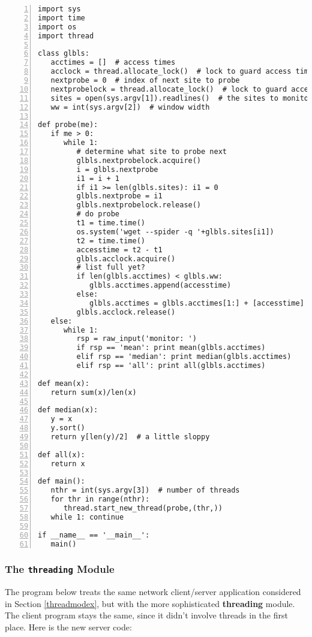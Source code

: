 \begin{Verbatim}[fontsize=\relsize{-2},numbers=left]
import sys
import time
import os
import thread

class glbls:
   acctimes = []  # access times
   acclock = thread.allocate_lock()  # lock to guard access time data
   nextprobe = 0  # index of next site to probe
   nextprobelock = thread.allocate_lock()  # lock to guard access time data
   sites = open(sys.argv[1]).readlines()  # the sites to monitor
   ww = int(sys.argv[2])  # window width

def probe(me):
   if me > 0:
      while 1:
         # determine what site to probe next
         glbls.nextprobelock.acquire()
         i = glbls.nextprobe
         i1 = i + 1
         if i1 >= len(glbls.sites): i1 = 0
         glbls.nextprobe = i1
         glbls.nextprobelock.release()
         # do probe
         t1 = time.time()
         os.system('wget --spider -q '+glbls.sites[i1])
         t2 = time.time()
         accesstime = t2 - t1  
         glbls.acclock.acquire()
         # list full yet?
         if len(glbls.acctimes) < glbls.ww:
            glbls.acctimes.append(accesstime)
         else:
            glbls.acctimes = glbls.acctimes[1:] + [accesstime]
         glbls.acclock.release()
   else:
      while 1:
         rsp = raw_input('monitor: ')
         if rsp == 'mean': print mean(glbls.acctimes)
         elif rsp == 'median': print median(glbls.acctimes)
         elif rsp == 'all': print all(glbls.acctimes)

def mean(x):
   return sum(x)/len(x)

def median(x):
   y = x
   y.sort()
   return y[len(y)/2]  # a little sloppy

def all(x):
   return x

def main():
   nthr = int(sys.argv[3])  # number of threads
   for thr in range(nthr):
      thread.start_new_thread(probe,(thr,))
   while 1: continue

if __name__ == '__main__': 
   main() 

\end{Verbatim}

\subsubsection{The {\tt threading} Module}  
\label{threadingmodex}

The program below treats the same network client/server application
considered in Section \ref{threadmodex}, but with the more sophisticated
{\bf threading} module.  The client program stays the same, since it
didn't involve threads in the first place.  Here is the new server code:

